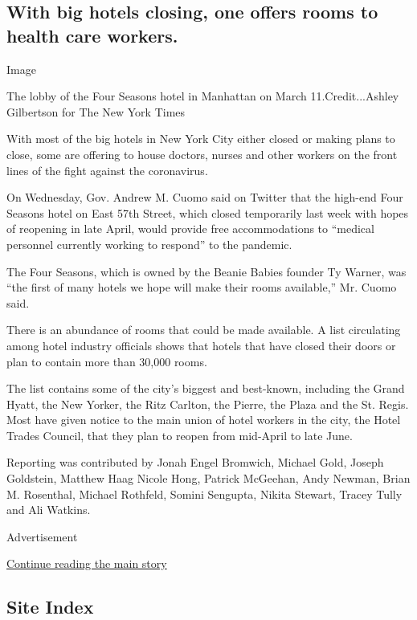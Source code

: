 \hypertarget{with-big-hotels-closing-one-offers-rooms-to-health-care-workers}{%
\subsection{With big hotels closing, one offers rooms to health care
workers.}\label{with-big-hotels-closing-one-offers-rooms-to-health-care-workers}}

Image

The lobby of the Four Seasons hotel in Manhattan on March
11.Credit...Ashley Gilbertson for The New York Times

With most of the big hotels in New York City either closed or making
plans to close, some are offering to house doctors, nurses and other
workers on the front lines of the fight against the coronavirus.

On Wednesday, Gov. Andrew M. Cuomo said on Twitter that the high-end
Four Seasons hotel on East 57th Street, which closed temporarily last
week with hopes of reopening in late April, would provide free
accommodations to ``medical personnel currently working to respond'' to
the pandemic.

The Four Seasons, which is owned by the Beanie Babies founder Ty Warner,
was ``the first of many hotels we hope will make their rooms
available,'' Mr. Cuomo said.

There is an abundance of rooms that could be made available. A list
circulating among hotel industry officials shows that hotels that have
closed their doors or plan to contain more than 30,000 rooms.

The list contains some of the city's biggest and best-known, including
the Grand Hyatt, the New Yorker, the Ritz Carlton, the Pierre, the Plaza
and the St. Regis. Most have given notice to the main union of hotel
workers in the city, the Hotel Trades Council, that they plan to reopen
from mid-April to late June.

Reporting was contributed by Jonah Engel Bromwich, Michael Gold, Joseph
Goldstein, Matthew Haag Nicole Hong, Patrick McGeehan, Andy Newman,
Brian M. Rosenthal, Michael Rothfeld, Somini Sengupta, Nikita Stewart,
Tracey Tully and Ali Watkins.

Advertisement

\protect\hyperlink{after-bottom}{Continue reading the main story}

\hypertarget{site-index}{%
\subsection{Site Index}\label{site-index}}

